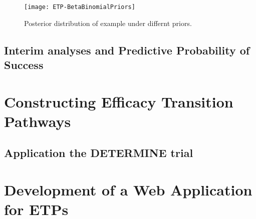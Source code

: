  \begin{figure}[h!]
	\centering
	\caption{Posterior distribution of example under differnt priors.}
	\label{fig_etp:bb_example_priors}
	\texttt{[image: ETP-BetaBinomialPriors]}
\end{figure}


\subsection{Interim analyses and Predictive Probability of Success}


\section{Constructing Efficacy Transition Pathways}


\subsection{Application the DETERMINE trial}


\section{Development of a Web Application for ETPs}